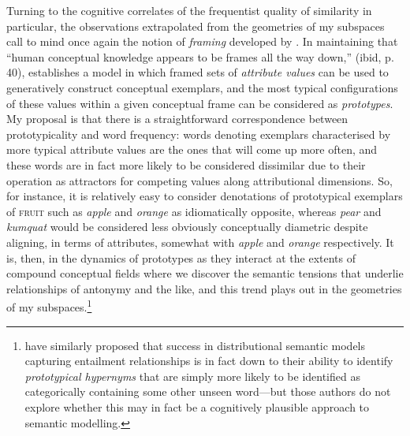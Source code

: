 Turning to the cognitive correlates of the frequentist quality of similarity in particular, the observations extrapolated from the geometries of my subspaces call to mind once again the notion of \emph{framing} developed by \cite{Barsalou1992}.  In maintaining that ``human conceptual knowledge appears to be frames all the way down,'' (ibid, p. 40), \citeauthor{Barsalou1992} establishes a model in which framed sets of \emph{attribute values} can be used to generatively construct conceptual exemplars, and the most typical configurations of these values within a given conceptual frame can be considered as \emph{prototypes}.  My proposal is that there is a straightforward correspondence between prototypicality and word frequency: words denoting exemplars characterised by more typical attribute values are the ones that will come up more often, and these words are in fact more likely to be considered dissimilar due to their operation as attractors for competing values along attributional dimensions.  So, for instance, it is relatively easy to consider denotations of prototypical exemplars of \textsc{fruit} such as \emph{apple} and \emph{orange} as idiomatically opposite, whereas \emph{pear} and \emph{kumquat} would be considered less obviously conceptually diametric despite aligning, in terms of attributes, somewhat with \emph{apple} and \emph{orange} respectively.  It is, then, in the dynamics of prototypes as they interact at the extents of compound conceptual fields where we discover the semantic tensions that underlie relationships of antonymy and the like, and this trend plays out in the geometries of my subspaces.\footnote{\cite{LevyEA2015} have similarly proposed that success in distributional semantic models capturing entailment relationships is in fact down to their ability to identify \emph{prototypical hypernyms} that are simply more likely to be identified as categorically containing some other unseen word---but those authors do not explore whether this may in fact be a cognitively plausible approach to semantic modelling.}


